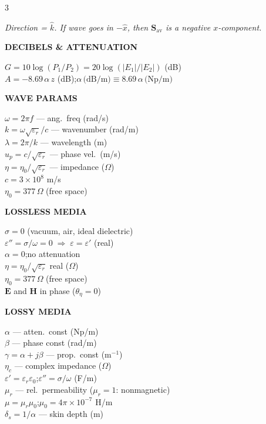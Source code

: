 \documentclass[6pt,letterpaper]{article}
\newcommand{\shead}[3]{%
  \noindent\colorbox{#1}{\parbox{\dimexpr\linewidth-2\fboxsep\relax}%
  {\color{#2}\bfseries\fontsize{6}{7}\selectfont #3}}\vspace{0.5pt}}
\begin{document}
\begin{multicols}{3}
\begin{ebox}
\textit{Direction = $\hat{k}$. If wave goes in $-\hat{x}$, then $\mathbf{S}_\text{av}$ is a negative $x$-component.}
\end{ebox}

\vspace{0.3pt}
\shead{greenbg}{green}{DECIBELS \& ATTENUATION}
\begin{ebox}
$G=10\log(P_1/P_2)=20\log(|E_1|/|E_2|)$ (dB)\\
$A=-8.69\,\alpha\,z$ (dB);\enspace$\alpha\,\text{(dB/m)}\equiv8.69\,\alpha\,\text{(Np/m)}$
\end{ebox}

\end{multicols}

\vfill
\noindent
\begin{minipage}[t]{0.19\linewidth}
\shead{purplebg}{purple}{WAVE PARAMS}
\begin{ebox}
$\omega=2\pi f$ --- ang.\ freq (rad/s)\\
$k=\omega\sqrt{\varepsilon_r}/c$ --- wavenumber (rad/m)\\
$\lambda=2\pi/k$ --- wavelength (m)\\
$u_p=c/\sqrt{\varepsilon_r}$ --- phase vel.\ (m/s)\\
$\eta=\eta_0/\sqrt{\varepsilon_r}$ --- impedance ($\Omega$)\\
$c=3\times10^8$ m/s\\
\textbf{$\eta_0=377\,\Omega$} (free space)
\end{ebox}
\end{minipage}\hfill
\begin{minipage}[t]{0.19\linewidth}
\shead{purplebg}{purple}{LOSSLESS MEDIA}
\begin{ebox}
$\sigma=0$ (vacuum, air, ideal dielectric)\\
$\varepsilon''=\sigma/\omega=0\;\Rightarrow\;\varepsilon=\varepsilon'$ (real)\\
$\alpha=0$;\enspace no attenuation\\
$\eta=\eta_0/\sqrt{\varepsilon_r}$ real ($\Omega$)\\
$\eta_0=377\,\Omega$ (free space)\\
$\mathbf{E}$ and $\mathbf{H}$ in phase ($\theta_\eta=0$)
\end{ebox}
\end{minipage}\hfill
\begin{minipage}[t]{0.19\linewidth}
\shead{coralbg}{coral}{LOSSY MEDIA}
\begin{ebox}
$\alpha$ --- atten.\ const (Np/m)\\
$\beta$ --- phase const (rad/m)\\
$\gamma=\alpha+j\beta$ --- prop.\ const (m$^{-1}$)\\
$\eta_c$ --- complex impedance ($\Omega$)\\
$\varepsilon'=\varepsilon_r\varepsilon_0$;\;$\varepsilon''=\sigma/\omega$ (F/m)\\
$\mu_r$ --- rel.\ permeability ($\mu_r=1$: nonmagnetic)\\
$\mu=\mu_r\mu_0$;\;$\mu_0=4\pi\times10^{-7}$ H/m\\
$\delta_s=1/\alpha$ --- skin depth (m)
\end{ebox}
\end{minipage}\hfill
\end{document}
